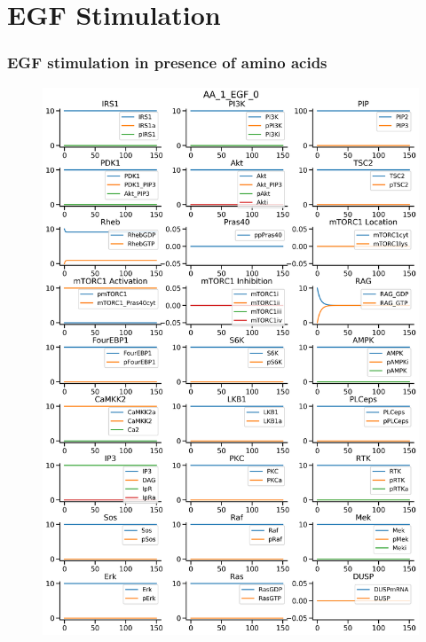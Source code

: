 \documentclass{beamer}
\begin{document}
\section{EGF Stimulation} %
\begin{frame}
\frametitle{EGF stimulation in presence of amino acids}
\begin{figure}
    \begin{minipage}{0.45\textwidth}
        \centering
        \includegraphics[width=\textwidth]{../simulations/ExtendedPI3KModel/validations/AAWithEGF/AA_1_EGF_0-2.png}
    \end{minipage}
    \begin{minipage}{0.45\textwidth}
        \centering

\end{minipage}
\end{figure}
\end{frame}
\end{document}
